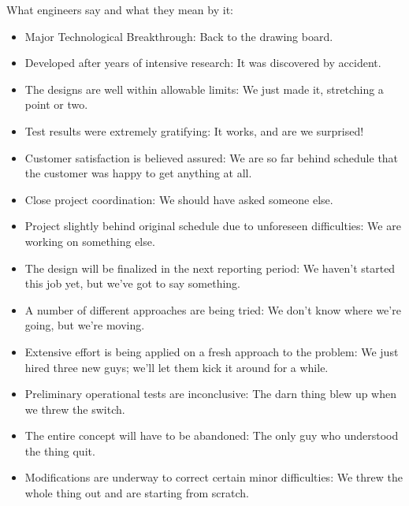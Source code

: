	\begin{center}\underline{\hspace{5 cm}}\end{center}

	What engineers say and what they mean by it:

	\begin{itemize} 
		\item Major Technological Breakthrough: Back to the drawing board. 
	
		\item Developed after years of intensive research: It was discovered by accident. 
	
		\item The designs are well within allowable limits: We just made it, stretching a point or two. 
	
		\item Test results were extremely gratifying: It works, and are we surprised! 
	
		\item Customer satisfaction is believed assured: We are so far behind schedule that the customer was happy to get anything at all. 
	
		\item Close project coordination: We should have asked someone else. 
	
		\item Project slightly behind original schedule due to unforeseen difficulties: We are working on something else. 
	
		\item The design will be finalized in the next reporting period: We haven't started this job yet, but we've got to say something. 
	
		\item A number of different approaches are being tried: We don't know where we're going, but we're moving.
	
		\item Extensive effort is being applied on a fresh approach to the problem: We just hired three new guys; we'll let them kick it around for a while.
	
		\item Preliminary operational tests are inconclusive: The darn thing blew up when we threw the switch. 
	
		\item The entire concept will have to be abandoned: The only guy who understood the thing quit. 
	
		\item Modifications are underway to correct certain minor difficulties: We threw the whole thing out and are starting from scratch. 
	

\end{itemize}
